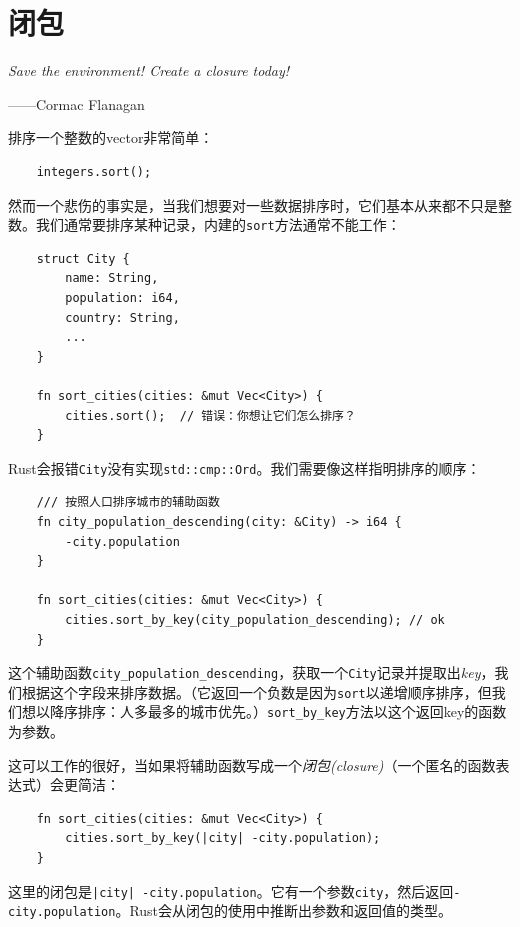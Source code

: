 \chapter{闭包}\label{ch14}

\emph{Save the environment! Create a closure today!}

\begin{flushright}
    ——Cormac Flanagan
\end{flushright}

排序一个整数的vector非常简单：
\begin{verbatim}
    integers.sort();
\end{verbatim}

然而一个悲伤的事实是，当我们想要对一些数据排序时，它们基本从来都不只是整数。我们通常要排序某种记录，内建的\texttt{sort}方法通常不能工作：
\begin{verbatim}
    struct City {
        name: String,
        population: i64,
        country: String,
        ...
    }

    fn sort_cities(cities: &mut Vec<City>) {
        cities.sort();  // 错误：你想让它们怎么排序？
    }
\end{verbatim}

Rust会报错\texttt{City}没有实现\texttt{std::cmp::Ord}。我们需要像这样指明排序的顺序：
\begin{verbatim}
    /// 按照人口排序城市的辅助函数
    fn city_population_descending(city: &City) -> i64 {
        -city.population
    }

    fn sort_cities(cities: &mut Vec<City>) {
        cities.sort_by_key(city_population_descending); // ok
    }
\end{verbatim}

这个辅助函数\texttt{city\_population\_descending}，获取一个\texttt{City}记录并提取出\emph{key}，我们根据这个字段来排序数据。（它返回一个负数是因为\texttt{sort}以递增顺序排序，但我们想以降序排序：人多最多的城市优先。）\texttt{sort\_by\_key}方法以这个返回key的函数为参数。

这可以工作的很好，当如果将辅助函数写成一个\emph{闭包(closure)}（一个匿名的函数表达式）会更简洁：
\begin{verbatim}
    fn sort_cities(cities: &mut Vec<City>) {
        cities.sort_by_key(|city| -city.population);
    }
\end{verbatim}

这里的闭包是\texttt{|city| -city.population}。它有一个参数\texttt{city}，然后返回\texttt{-city.population}。Rust会从闭包的使用中推断出参数和返回值的类型。


